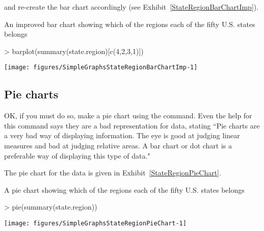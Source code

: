 and re-create the bar chart accordingly (see Exhibit~\ref{StateRegionBarChartImp}). 
\begin{exhibit} 
\begin{center} 
\caption{An improved bar chart showing which of the regions each of the fifty U.S. states belongs} 
\label{StateRegionBarChartImp} 

\begin{Schunk}
\begin{Sinput}
> barplot(summary(state.region)[c(4,2,3,1)]) 
\end{Sinput}

\texttt{[image: figures/SimpleGraphsStateRegionBarChartImp-1]} \end{Schunk}

\end{center} 
\end{exhibit} 
 
\subsection{Pie charts} 
 
OK, if you must do so, make a pie chart using the  command. Even the help for this command says they are a bad representation for data, stating ``Pie charts are a very bad way of displaying information. The eye is good at judging linear measures and bad at judging relative areas. A bar chart or dot chart is a preferable way of displaying this type of data."  
 
The pie chart for the  data is given in Exhibit~\ref{StateRegionPieChart}. 
\begin{exhibit} 
\begin{center} 
\caption{A pie chart showing which of the regions each of the fifty U.S. states belongs} 
\label{StateRegionPieChart} 

\begin{Schunk}
\begin{Sinput}
> pie(summary(state.region)) 
\end{Sinput}

\texttt{[image: figures/SimpleGraphsStateRegionPieChart-1]} \end{Schunk}

\end{center} 
\end{exhibit} 
 
